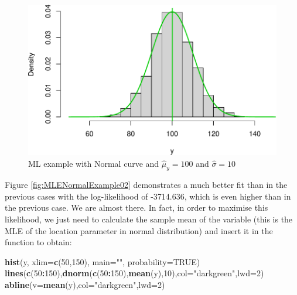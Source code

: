\documentclass[
]{book}
\newenvironment{Shaded}{\begin{snugshade}}{\end{snugshade}}
\newcommand{\AttributeTok}[1]{\textcolor[rgb]{0.13,0.29,0.53}{#1}}
\newcommand{\ConstantTok}[1]{\textcolor[rgb]{0.56,0.35,0.01}{#1}}
\newcommand{\DecValTok}[1]{\textcolor[rgb]{0.00,0.00,0.81}{#1}}
\newcommand{\FunctionTok}[1]{\textcolor[rgb]{0.13,0.29,0.53}{\textbf{#1}}}
\newcommand{\NormalTok}[1]{#1}
\newcommand{\SpecialCharTok}[1]{\textcolor[rgb]{0.81,0.36,0.00}{\textbf{#1}}}
\newcommand{\StringTok}[1]{\textcolor[rgb]{0.31,0.60,0.02}{#1}}
\theoremstyle{definition}
\theoremstyle{definition}
\theoremstyle{definition}
\theoremstyle{definition}
\theoremstyle{remark}
\begin{document}
\begin{figure}
\centering
\includegraphics{Svetunkov---Statistics-for-Business-Analytics_files/figure-latex/MLENormalExample03-1.pdf}
\caption{\label{fig:MLENormalExample03}ML example with Normal curve and \(\hat{\mu}_y=100\) and \(\hat{\sigma}=10\)}
\end{figure}

Figure \ref{fig:MLENormalExample02} demonstrates a much better fit than in the previous cases with the log-likelihood of -3714.636, which is even higher than in the previous case. We are almost there. In fact, in order to maximise this likelihood, we just need to calculate the sample mean of the variable (this is the MLE of the location parameter in normal distribution) and insert it in the function to obtain:

\begin{Shaded}
\begin{Highlighting}[]
\FunctionTok{hist}\NormalTok{(y, }\AttributeTok{xlim=}\FunctionTok{c}\NormalTok{(}\DecValTok{50}\NormalTok{,}\DecValTok{150}\NormalTok{), }\AttributeTok{main=}\StringTok{""}\NormalTok{, }\AttributeTok{probability=}\ConstantTok{TRUE}\NormalTok{)}
\FunctionTok{lines}\NormalTok{(}\FunctionTok{c}\NormalTok{(}\DecValTok{50}\SpecialCharTok{:}\DecValTok{150}\NormalTok{),}\FunctionTok{dnorm}\NormalTok{(}\FunctionTok{c}\NormalTok{(}\DecValTok{50}\SpecialCharTok{:}\DecValTok{150}\NormalTok{),}\FunctionTok{mean}\NormalTok{(y),}\DecValTok{10}\NormalTok{),}\AttributeTok{col=}\StringTok{"darkgreen"}\NormalTok{,}\AttributeTok{lwd=}\DecValTok{2}\NormalTok{)}
\FunctionTok{abline}\NormalTok{(}\AttributeTok{v=}\FunctionTok{mean}\NormalTok{(y),}\AttributeTok{col=}\StringTok{"darkgreen"}\NormalTok{,}\AttributeTok{lwd=}\DecValTok{2}\NormalTok{)}
\end{Highlighting}
\end{Shaded}
\end{document}
